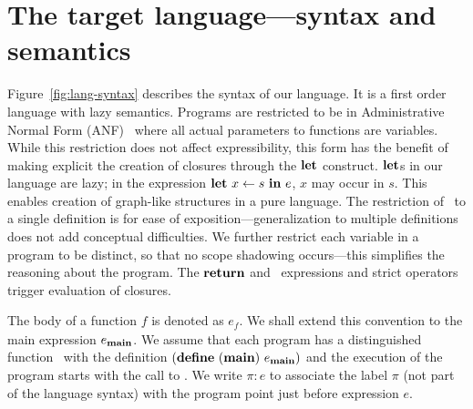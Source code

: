 \documentclass[9pt]{sigplanconf}
\begin{document}
\section{The target language---syntax and semantics}
\label{sec:defs}
Figure~\ref{fig:lang-syntax} describes the syntax  of our language. It
is a first order language with lazy semantics. Programs are restricted
to        be        in        Administrative        Normal        Form
(ANF)~\cite{chakravarty03perspective} where  all actual  parameters to
functions  are  variables.  While  this  restriction  does not  affect
expressibility,  this form  has  the benefit  of  making explicit  the
creation of  closures through  the $\mbox{$\mathbf{ let}$}$  construct.  $\mbox{$\mathbf{ let}$}$s  in our
language  are lazy;  in the  expression $\mbox{$\mathbf{ let}$}\,\,  x \leftarrow  s\,\,
\mbox{$\mathbf{ in}$}\,\, e$, $x$ may occur in  $s$. This enables creation of graph-like
structures in  a pure language. The  restriction of \LET\ to  a single
definition  is for  ease  of  exposition---generalization to  multiple
definitions does not add conceptual difficulties.  We further restrict
each variable in a program to  be distinct, so that no scope shadowing
occurs---this  simplifies  the  reasoning   about  the  program.   The
$\mbox{$\mathbf{ return}$}$  and   \SIF\  expressions  and  strict   operators  trigger
evaluation of closures.

The body  of a function ${\mathit  f}$ is denoted  as $e_{\mathit f}$.
We   shall   extend   this   convention   to   the   main   expression
$e_{\mathbf{main}}$. We assume that each program has a distinguished function
\mainpgm\      with      the      definition     $(\mbox{$\mathbf{define}$}\      ({\tt
  \mathbf{main}})\  e_{\mathbf{main}})$ and  the execution  of the  program starts
with the call to \mainpgm.  We write $\pi\!:\!e$ to associate the label
$\pi$ (not  part of the language  syntax) with the  program point just
before expression $e$.
\end{document}
